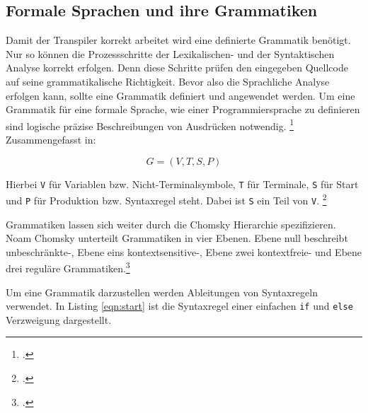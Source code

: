 \pagebreak
   
   
\subsection{Formale Sprachen und ihre Grammatiken}

Damit der Transpiler korrekt arbeitet wird eine definierte Grammatik benötigt. Nur so können die Prozessschritte der Lexikalischen- und der Syntaktischen Analyse korrekt erfolgen. Denn diese Schritte prüfen den eingegeben Quellcode auf seine grammatikalische Richtigkeit. Bevor also die Sprachliche Analyse erfolgen kann, sollte eine Grammatik definiert und angewendet werden. Um eine Grammatik für eine formale Sprache, wie einer Programmiersprache zu definieren sind logische präzise Beschreibungen von Ausdrücken notwendig. \footcite[Vgl. ][S. 149ff. ]{automata} Zusammengefasst in:

\begin{center}
\begin{equation}\label{eqn:grammar}
G=(V,T,S,P)
\end{equation}
\end{center}

Hierbei \verb+V+ für Variablen bzw. Nicht-Terminalsymbole, \verb+T+ für Terminale, \verb+S+ für Start und \verb+P+ für Produktion bzw. Syntaxregel steht. Dabei ist \verb+S+ ein Teil von \verb+V+.  \footcite[Vgl. ][S. 31ff. ]{automata}

Grammatiken lassen sich weiter durch die Chomsky Hierarchie spezifizieren. Noam Chomsky unterteilt Grammatiken in vier Ebenen. Ebene null beschreibt unbeschränkte-, Ebene eins kontextsensitive-, Ebene zwei kontextfreie- und Ebene drei reguläre Grammatiken.\footcite[Vgl. ][]{chomsky}

\pagebreak

Um eine Grammatik darzustellen werden Ableitungen von Syntaxregeln verwendet. In Listing \ref{eqn:start} ist die Syntaxregel einer einfachen \verb+if+ und \verb+else+ Verzweigung dargestellt.

